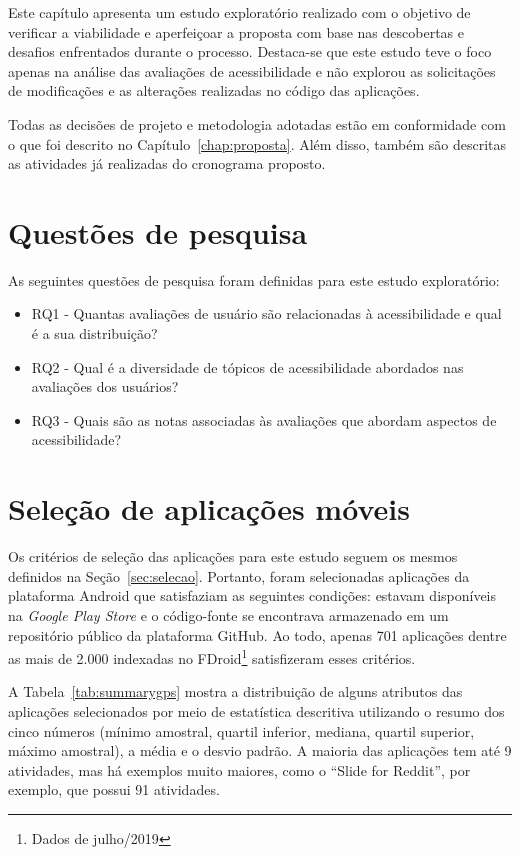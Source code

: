 Este capítulo apresenta um estudo exploratório realizado com o objetivo de verificar a viabilidade e aperfeiçoar a proposta com base nas descobertas e desafios enfrentados durante o processo. Destaca-se que este estudo teve o foco apenas na análise das avaliações de acessibilidade e não explorou as solicitações de modificações e as alterações realizadas no código das aplicações. 


Todas as decisões de projeto e metodologia adotadas estão em conformidade com o que foi descrito no Capítulo~\ref{chap:proposta}.
Além disso, também são descritas as atividades já realizadas do cronograma proposto.

\section{Questões de pesquisa}

As seguintes questões de pesquisa foram definidas para este estudo exploratório:
\begin{itemize}
 \item RQ1 - Quantas avaliações de usuário são relacionadas à acessibilidade e qual é a sua distribuição? 
 \item RQ2 - Qual é a diversidade de tópicos de acessibilidade abordados nas avaliações dos usuários?
 \item RQ3 - Quais são as notas associadas às avaliações que abordam aspectos de acessibilidade?  
\end{itemize}

\section{Seleção de aplicações móveis}

Os critérios de seleção das aplicações para este estudo seguem os mesmos definidos na Seção~\ref{sec:selecao}. Portanto, foram selecionadas aplicações da plataforma Android que satisfaziam as seguintes condições: estavam disponíveis na \textit{Google Play Store} e o código-fonte se encontrava armazenado em um repositório público da plataforma GitHub. Ao todo, apenas 701 aplicações dentre as mais de 2.000 indexadas no FDroid\footnote{Dados de julho/2019} satisfizeram esses critérios.

A Tabela~\ref{tab:summarygps} mostra a distribuição de alguns atributos das aplicações selecionados por meio de estatística descritiva utilizando o resumo dos cinco números (mínimo amostral, quartil inferior, 
mediana, quartil superior, máximo amostral), a média e o desvio padrão. 
A maioria das aplicações tem até 9 atividades, mas há exemplos muito maiores, como o ``Slide for Reddit'', por exemplo, que possui 91 atividades.

